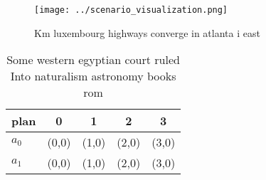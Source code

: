 \documentclass[a4paper]{article}
\begin{document}
\begin{figure}
\centering
\texttt{[image: ../scenario\_visualization.png]}
\caption{Km luxembourg highways converge in atlanta i east
}
\end{figure}
 
\begin{table}
\begin{adjustbox}{width=0.5\columnwidth}
\begin{tabular}{|l|l|l|l|l|}
\hline
\textbf{plan} & \multicolumn{1}{c|}{\textbf{0}} & \multicolumn{1}{c|}{\textbf{1}} & \multicolumn{1}{c|}{\textbf{2}} & \multicolumn{1}{c|}{\textbf{3}} \\ \hline
\textbf{$a_0$}  & (0,0) & (1,0) & (2,0) & (3,0) \\ \hline
\textbf{$a_1$}  & (0,0) & (1,0) & (2,0) & (3,0) \\ \hline
\end{tabular}
\end{adjustbox}
\caption{Some western egyptian court ruled Into naturalism astronomy books rom
}
\end{table}
\end{document}
